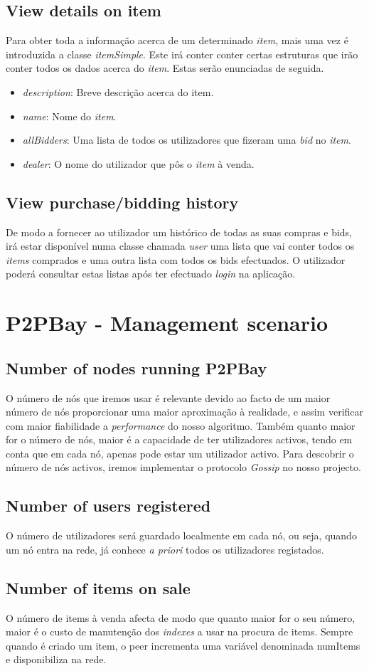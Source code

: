 \documentclass[paper=a4, fontsize=11pt]{scrartcl}
\numberwithin{equation}{section}    %
\numberwithin{figure}{section}      %
\numberwithin{table}{section}       %
\begin{document}
\subsection{View details on item} 
Para obter toda a informação acerca de um determinado \textit{item}, mais uma vez é introduzida a classe \textit{itemSimple}. Este irá conter conter certas estruturas que irão conter todos os dados acerca do \textit{item}. Estas serão enunciadas de seguida.
\begin{itemize}
  \item \textit{description}: Breve descrição acerca do item.
  \item \textit{name}: Nome do \textit{item}.
  \item \textit{allBidders}: Uma lista de todos os utilizadores que fizeram uma \textit{bid} no \textit{item}.
  \item \textit{dealer}: O nome do utilizador que pôs o \textit{item} à venda.  
\end{itemize}


\subsection{View purchase/bidding history}
De modo a fornecer ao utilizador um histórico de todas as suas compras e bids, irá estar disponível numa classe chamada \textit{user} uma lista que vai conter todos os \textit{items} comprados e uma outra lista com todos os bids efectuados. O utilizador poderá consultar estas listas após ter efectuado \textit{login} na aplicação.

\section{P2PBay - Management scenario}

\subsection{Number of nodes running P2PBay}
O número de nós que iremos usar é relevante devido ao facto de um maior número de nós proporcionar uma maior aproximação à realidade, e assim verificar com maior fiabilidade a \textit{performance} do nosso algoritmo. Também quanto maior for o número de nós, maior é a capacidade de ter utilizadores activos, tendo em conta que em cada nó, apenas pode estar um utilizador activo.
Para descobrir o número de nós activos, iremos implementar o protocolo \textit{Gossip} no nosso projecto.
\subsection{Number of users registered}
O número de utilizadores será guardado localmente em cada nó, ou seja, quando um nó entra na rede, já conhece \textit{a priori} todos os utilizadores registados.
\subsection{Number of items on sale}
O número de items à venda afecta de modo que quanto maior for o seu número, maior é o custo de manutenção dos \textit{indexes} a usar na procura de items. Sempre quando é criado um item, o peer incrementa uma variável denominada numItems e disponibiliza na rede. 
\end{document}

